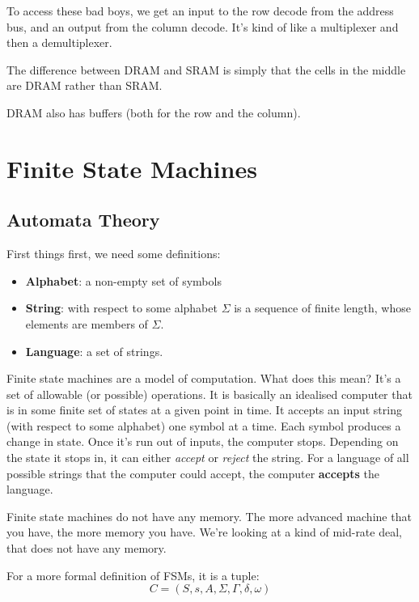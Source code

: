 \documentclass[11pt,a4paper,titlepage,dvipsnames,cmyk]{scrartcl}
\begin{document}
To access these bad boys, we get an input to the row decode from the
address bus, and an output from the column decode. It's kind of like a
multiplexer and then a demultiplexer.

The difference between DRAM and SRAM is simply that the cells in the
middle are DRAM rather than SRAM.

DRAM also has buffers (both for the row and the column). 

\section{Finite State Machines}%
\label{sec:FSMs}

\subsection{Automata Theory}%
\label{sub:automata}

First things first, we need some definitions:
\begin{itemize}
    \item \textbf{Alphabet}: a non-empty set of symbols
    \item \textbf{String}: with respect to some alphabet $\Sigma$ is a
        sequence of finite length, whose elements are members of $\Sigma$.
    \item \textbf{Language}: a set of strings.
\end{itemize}

Finite state machines are a model of computation. What does this mean?
It's a set of allowable (or possible) operations. It is basically an
idealised computer that is in some finite set of states at a given point
in time. It accepts an input string (with respect to some alphabet) one
symbol at a time. Each symbol produces a change in state. Once it's run
out of inputs, the computer stops. Depending on the state it stops in, it
can either \textit{accept} or \textit{reject} the string. For a language
of all possible strings that the computer could accept, the
computer \textbf{accepts} the language.

Finite state machines do not have any memory. The more advanced machine
that you have, the more memory you have. We're looking at a kind of
mid-rate deal, that does not have any memory.

For a more formal definition of FSMs, it is a tuple:
\begin{equation*}
    C = (S,s,A,\Sigma,\Gamma,\delta,\omega)
\end{equation*}
\end{document}
